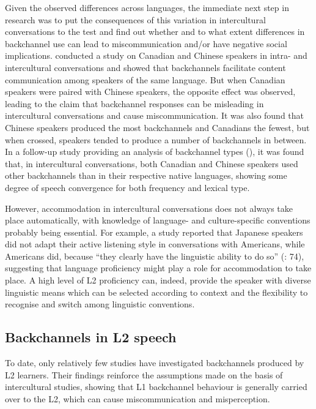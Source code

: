Given the observed differences across languages, the immediate next step in research was to put the consequences of this variation in intercultural conversations to the test and find out whether and to what extent differences in backchannel use can lead to miscommunication and/or have negative social implications. \citet{Li2006} conducted a study on Canadian and Chinese speakers in intra- and intercultural conversations and showed that backchannels facilitate content communication among speakers of the same language. But when Canadian speakers were paired with Chinese speakers, the opposite effect was observed, leading to the claim that backchannel responses can be misleading in intercultural conversations and cause miscommunication. It was also found that Chinese speakers produced the most backchannels and Canadians the fewest, but when crossed, speakers tended to produce a number of backchannels in between. In a follow-up study providing an analysis of backchannel types (\citealt{CuiWang2010}), it was found that, in intercultural conversations, both Canadian and Chinese speakers used other backchannels than in their respective native languages, showing some degree of speech convergence for both frequency and lexical type.

However, accommodation in intercultural conversations does not always take place automatically, with knowledge of language- and culture-specific conventions probably being essential. For example, a study reported that Japanese speakers did not adapt their active listening style in conversations with Americans, while Americans did, because “they clearly have the linguistic ability to do so” (\citealt{White1989}: 74), suggesting that language proficiency might play a role for accommodation to take place. A high level of L2 proficiency can, indeed, provide the speaker with diverse linguistic means which can be selected according to context and the flexibility to recognise and switch among linguistic conventions.

\subsection{Backchannels in L2 speech}
\label{sec:4.1.4}
To date, only relatively few studies have investigated backchannels produced by L2 learners. Their findings reinforce the assumptions made on the basis of intercultural studies, showing that L1 backchannel behaviour is generally carried over to the L2, which can cause miscommunication and misperception.

